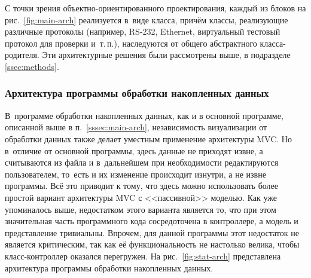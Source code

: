\documentclass[a4paper, 14pt, titlepage]{extarticle}
\begin{document}
  С точки зрения объектно-ориентированного проектирования, каждый из блоков на рис.~\ref{fig:main-arch}
  реализуется в~виде класса, причём классы, реализующие различные протоколы (например, RS-232,
  Ethernet, виртуальный тестовый протокол для проверки и~т.\,п.), наследуются от общего абстрактного
  класса-родителя. Эти архитектурные решения были рассмотрены выше, в подразделе \ref{ssec:methods}.

  \subsubsection{Архитектура программы обработки накопленных данных}

  В~программе обработки накопленных данных, как и в основной программе, описанной выше в
  п.~\ref{sssec:main-arch}, независимость визуализации от обработки данных также делает уместным
  применение архитектуры MVC. Но в~отличие от основной программы, здесь данные не приходят извне, а
  считываются из файла и в~дальнейшем при необходимости редактируются пользователем, то~есть и их
  изменение происходит изнутри, а не извне программы. Всё это приводит к тому, что здесь можно использовать
  более простой вариант архитектуры MVC с <<пассивной>> моделью. Как уже упоминалось выше, недостатком этого варианта является
  то, что при этом значительная часть программного кода сосредоточена в контроллере, а модель и
  представление тривиальны. Впрочем, для данной программы этот недостаток не является критическим,
  так как её функциональность не настолько велика, чтобы класс-контроллер оказался перегружен.
  На рис.~\ref{fig:stat-arch} представлена архитектура программы обработки накопленных данных.
\end{document}
